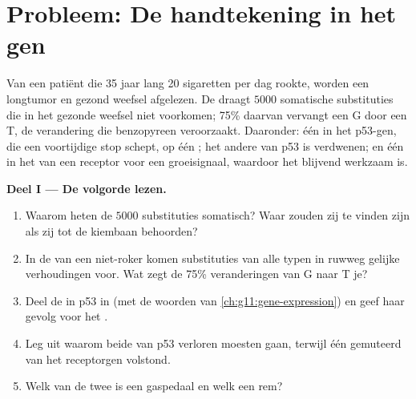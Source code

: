 \section{Probleem: De handtekening in het gen}

\begin{problem}
\label{pb:g11:cancer:1}
Van een patiënt die 35 jaar lang 20 sigaretten per dag rookte, worden een
longtumor en gezond weefsel afgelezen. De  draagt $\num{5000}$
somatische substituties die in het gezonde weefsel niet voorkomen; 75\%
daarvan vervangt een G door een T, de verandering die benzopyreen
veroorzaakt. Daaronder: één in het p53-gen, die een voortijdige stop
schept, op één ; het andere  van p53 is verdwenen; en één in het
 van een receptor voor een groeisignaal, waardoor het  blijvend
werkzaam is.

\medskip
\noindent\textbf{Deel I --- De volgorde lezen.}
\begin{enumerate}
  \item Waarom heten de $\num{5000}$ substituties somatisch? Waar zouden
        zij te vinden zijn als zij tot de kiembaan behoorden?
  \item In de  van een niet-roker komen substituties van alle
        typen in ruwweg gelijke verhoudingen voor. Wat zegt de 75\%
        veranderingen van G naar T je?
  \item Deel de  in p53 in (met de woorden van
        \cref{ch:g11:gene-expression}) en geef haar gevolg voor het
        .
  \item Leg uit waarom beide  van p53 verloren moesten gaan,
        terwijl één gemuteerd  van het receptorgen volstond.
  \item Welk van de twee  is een gaspedaal en welk een rem?
\end{enumerate}


\end{problem}
